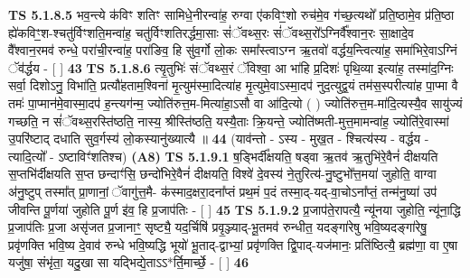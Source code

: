 \documentclass[17pt]{extarticle}
\begin{document}
                  \newline
                                \textbf{ TS 5.1.8.5} \newline
                  भव॒न्त्ये क॑विꣳ शतिꣳ सामिधे॒नीरन्वा॑ह॒ रुग्वा ए॑कविꣳ॒॒शो रुच॑मे॒व ग॑च्छ॒त्यथो᳚ प्रति॒ष्ठामे॒व प्र॑ति॒ष्ठा ह्ये॑कविꣳ॒॒श-श्चतु॑र्विꣳशति॒मन्वा॑ह॒ चतु॑र्विꣳशतिरर्द्धमा॒साः सं॑ॅवथ्स॒रः सं॑ॅवथ्स॒रो᳚ऽग्निर्वै᳚श्वान॒रः सा॒क्षादे॒व वै᳚श्वान॒रमव॑ रुन्धे॒ परा॑ची॒रन्वा॑ह॒ परा॑ङिव॒ हि सु॑व॒र्गो लो॒कः समा᳚स्त्वाऽग्न ऋ॒तवो॑ वर्द्धय॒न्त्वित्या॑ह॒ समा॑भिरे॒वाऽग्निं ॅव॑र्द्धय - [  ] \textbf{  43} \newline
                  \newline
                                \textbf{ TS 5.1.8.6} \newline
                  त्यृ॒तुभिः॑ संॅवथ्स॒रं ॅविश्वा॒ आ भा॑हि प्र॒दिशः॑ पृथि॒व्या इत्या॑ह॒ तस्मा॑द॒ग्निः सर्वा॒ दिशोऽनु॒ विभा॑ति॒ प्रत्यौ॑हताम॒श्विना॑ मृ॒त्युम॑स्मा॒दित्या॑ह मृ॒त्युमे॒वाऽस्मा॒दप॑ नुद॒त्युद्व॒यं तम॑स॒स्परीत्या॑ह पा॒प्मा वै तमः॑ पा॒प्मान॑मे॒वास्मा॒दप॑ ह॒न्त्यग॑न्म॒ ज्योति॑रुत्त॒म-मित्या॑हा॒ऽसौ वा आ॑दि॒त्यो ( ) ज्योति॑रुत्त॒म-मा॑दि॒त्यस्यै॒व सायु॑ज्यं गच्छति॒ न सं॑ॅवथ्स॒रस्ति॑ष्ठति॒ नास्य॒ श्रीस्ति॑ष्ठति॒ यस्यै॒ताः क्रि॒यन्ते॒ ज्योति॑ष्मती-मुत्त॒मामन्वा॑ह॒ ज्योति॑रे॒वास्मा॑ उ॒परि॑ष्टाद् दधाति सुव॒र्गस्य॑ लो॒कस्यानु॑ख्यात्यै ॥ \textbf{  44} \newline
                  \newline
                      (याव॑न्तो - ऽस्य - मुख॒त - श्चित्य॑स्य - वर्द्धय - त्यादि॒त्यो᳚ - ऽष्टाविꣳ॑शतिश्च)  \textbf{(A8)} \newline \newline
                                        \textbf{ TS 5.1.9.1} \newline
                  ष॒ड्भिर्दी᳚क्षयति॒ षड्वा ऋ॒तव॑ ऋ॒तुभि॑रे॒वैनं॑ दीक्षयति स॒प्तभि॑र्दीक्षयति स॒प्त छन्दाꣳ॑सि॒ छन्दो॑भिरे॒वैनं॑ दीक्षयति॒ विश्वे॑ दे॒वस्य॑ ने॒तुरित्य॑-नु॒ष्टुभो᳚त्त॒मया॑ जुहोति॒ वाग्वा अ॑नु॒ष्टुप् तस्मा᳚त् प्रा॒णानां॒ ॅवागु॑त्त॒मै- क॑स्माद॒क्षरा॒दना᳚प्तं प्रथ॒मं प॒दं तस्मा॒द्-यद्-वा॒चोऽना᳚प्तं॒ तन्म॑नु॒ष्या॑ उप॑ जीवन्ति पू॒र्णया॑ जुहोति पू॒र्ण इ॑व॒ हि प्र॒जाप॑तिः - [  ] \textbf{  45} \newline
                  \newline
                                \textbf{ TS 5.1.9.2} \newline
                  प्र॒जाप॑ते॒रापत्यै॒ न्यू॑नया जुहोति॒ न्यू॑ना॒द्धि प्र॒जाप॑तिः प्र॒जा असृ॑जत प्र॒जानाꣳ॒॒ सृष्ट्यै॒ यद॒र्चिषि॑ प्रवृ॒ञ्ज्याद्-भू॒तमव॑ रुन्धीत॒ यदङ्गा॑रेषु भवि॒ष्यदङ्गा॑रेषु॒ प्रवृ॑णक्ति भवि॒ष्य दे॒वाव॑ रुन्धे भवि॒ष्यद्धि भूयो॑ भू॒ताद्-द्वाभ्यां॒ प्रवृ॑णक्ति द्वि॒पाद्-यज॑मानः॒ प्रति॑ष्ठित्यै॒ ब्रह्म॑णा॒ वा ए॒षा यजु॑षा॒ संभृ॑ता॒ यदु॒खा सा यद्भिद्ये॒ताऽऽ*र्ति॒मार्च्छे॒ - [  ] \textbf{  46} \newline
\end{document}
